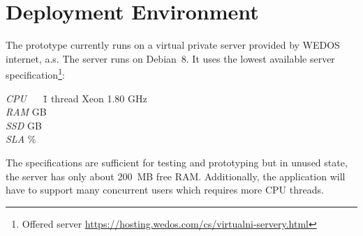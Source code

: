 \section{Deployment Environment}
\label{section:deploy}
The prototype currently runs on a virtual private server provided by WEDOS internet, a.s. The server runs on Debian~8. It uses the lowest available server specification\footnote{Offered server \url{https://hosting.wedos.com/cs/virtualni-servery.html}}:
\begin{tabbing}
	\textit{CPU} ~~ \= 1 thread Xeon 1.80 GHz\\
	\textit{RAM}  GB\\
	\textit{SSD}  GB\\
	\textit{SLA} \%
\end{tabbing}

The specifications are sufficient for testing and prototyping but in unused state, the server has only about 200~MB free RAM. Additionally, the application will have to support many concurrent users which requires more CPU threads.  